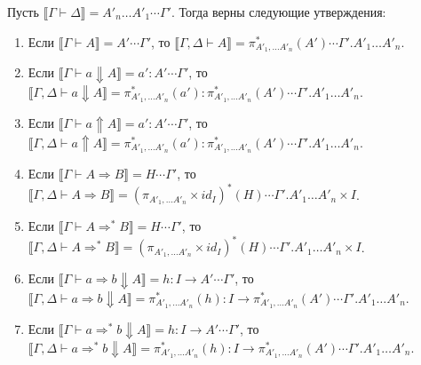 \documentclass{amsart}
\theoremstyle{definition}
\theoremstyle{remark}
\newcommand{\red}{\Rightarrow}
\renewcommand{\ll}{\llbracket}
\newcommand{\rr}{\rrbracket}
\numberwithin{figure}{section}
\begin{document}
\begin{lem}
Пусть $\ll \Gamma \vdash \Delta\rr = A'_n \ldots A'_1 \dotsb \Gamma'$.
Тогда верны следующие утверждения:
\begin{enumerate}
\item Если $\ll \Gamma \vdash A \rr = A' \dotsb \Gamma'$, то $\ll \Gamma, \Delta \vdash A \rr = \pi_{A'_1, \ldots A'_n}^*(A') \dotsb \Gamma'.A'_1 \ldots A'_n$.
\item Если $\ll \Gamma \vdash a \Downarrow A \rr = a' : A' \dotsb \Gamma'$, то $\ll \Gamma, \Delta \vdash a \Downarrow A \rr = \pi_{A'_1, \ldots A'_n}^*(a') : \pi_{A'_1, \ldots A'_n}^*(A') \dotsb \Gamma'.A'_1 \ldots A'_n$.
\item Если $\ll \Gamma \vdash a \Uparrow A \rr = a' : A' \dotsb \Gamma'$, то $\ll \Gamma, \Delta \vdash a \Uparrow A \rr = \pi_{A'_1, \ldots A'_n}^*(a') : \pi_{A'_1, \ldots A'_n}^*(A') \dotsb \Gamma'.A'_1 \ldots A'_n$.
\item Если $\ll \Gamma \vdash A \red B \rr = H \dotsb \Gamma'$, то $\ll \Gamma, \Delta \vdash A \red B \rr = (\pi_{A'_1, \ldots A'_n} \times id_I)^*(H) \dotsb \Gamma'.A'_1 \ldots A'_n \times I$.
\item Если $\ll \Gamma \vdash A \red^* B \rr = H \dotsb \Gamma'$, то $\ll \Gamma, \Delta \vdash A \red^* B \rr = (\pi_{A'_1, \ldots A'_n} \times id_I)^*(H) \dotsb \Gamma'.A'_1 \ldots A'_n \times I$.
\item Если $\ll \Gamma \vdash a \red b \Downarrow A \rr = h : I \to A' \dotsb \Gamma'$, то $\ll \Gamma, \Delta \vdash a \red b \Downarrow A \rr = \pi_{A'_1, \ldots A'_n}^*(h) : I \to \pi_{A'_1, \ldots A'_n}^*(A') \dotsb \Gamma'.A'_1 \ldots A'_n$.
\item Если $\ll \Gamma \vdash a \red^* b \Downarrow A \rr = h : I \to A' \dotsb \Gamma'$, то $\ll \Gamma, \Delta \vdash a \red^* b \Downarrow A \rr = \pi_{A'_1, \ldots A'_n}^*(h) : I \to \pi_{A'_1, \ldots A'_n}^*(A') \dotsb \Gamma'.A'_1 \ldots A'_n$.
\end{enumerate}
\end{lem}
\end{document}
